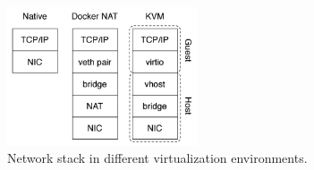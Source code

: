 \begin{figure}
	\centering{}
	\includegraphics[width=0.5\textwidth]{chapters/measurements/images/network-stack.png}
	\caption[Network stack in different environments]{Network stack in different virtualization
		environments.}
	\label{img:measurements-network-result-stacks}
\end{figure}